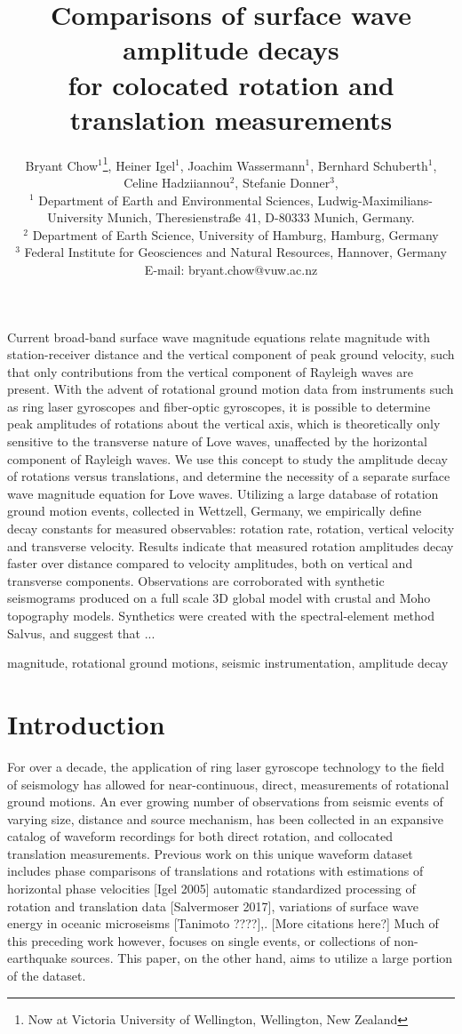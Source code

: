 \documentclass{gji}
\title[Comparisons of surface wave amplitude decays]
  {Comparisons of surface wave amplitude decays \\for colocated rotation and translation measurements}
\author[Bryant Chow]
  {Bryant Chow$^1$\thanks{Now at Victoria University of Wellington, Wellington, New Zealand}, 
  Heiner Igel$^1$, 
  Joachim Wassermann$^1$,
  Bernhard Schuberth$^1$,
  Celine Hadziiannou$^2$,
  Stefanie Donner$^3$,\\
  $^1$ Department of Earth and Environmental Sciences, Ludwig-Maximilians-University Munich, Theresienstra\ss e 41, D-80333 Munich, Germany.\\
  $^2$ Department of Earth Science, University of Hamburg, Hamburg, Germany\\
  $^3$ Federal Institute for Geosciences and Natural Resources, Hannover, Germany \\E-mail: bryant.chow@vuw.ac.nz
  }
\date{}
\begin{document}
\label{firstpage}

\maketitle

\begin{summary}
Current broad-band surface wave magnitude equations relate magnitude with station-receiver distance and the vertical component of peak ground velocity, such that only contributions from the vertical component of Rayleigh waves are present. With the advent of rotational ground motion data from instruments such as ring laser gyroscopes and fiber-optic gyroscopes, it is possible to determine peak amplitudes of rotations about the vertical axis, which is theoretically only sensitive to the transverse nature of Love waves, unaffected by the horizontal component of Rayleigh waves. We use this concept to study the amplitude decay of rotations versus translations, and determine the necessity of a separate surface wave magnitude equation for Love waves. Utilizing a large database of rotation ground motion events, collected in Wettzell, Germany, we empirically define decay constants for measured observables: rotation rate, rotation, vertical velocity and transverse velocity. Results indicate that measured rotation amplitudes decay faster over distance compared to velocity amplitudes, both on vertical and transverse components. Observations are corroborated with synthetic seismograms produced on a full scale 3D global model with crustal and Moho topography models. Synthetics were created with the spectral-element method Salvus, and suggest that ...
\end{summary}

\begin{keywords}
magnitude, rotational ground motions, seismic instrumentation, amplitude decay
\end{keywords}

\section{Introduction} 
For over a decade, the application of ring laser gyroscope technology to the field of seismology has allowed for near-continuous, direct, measurements of rotational ground motions. An ever growing number of observations from seismic events of varying size, distance and source mechanism, has been collected in an expansive catalog of waveform recordings for both direct rotation, and collocated translation measurements.
Previous work on this unique waveform dataset includes phase comparisons of translations and rotations with estimations of horizontal phase velocities [Igel 2005] %
automatic standardized processing of rotation and translation data [Salvermoser 2017],
variations of surface wave energy in oceanic microseisms [Tanimoto ????],. [More citations here?] %
Much of this preceding work however, focuses on single events, or collections of non-earthquake sources. This paper, on the other hand, aims to utilize a large portion of the dataset.
\end{document}
